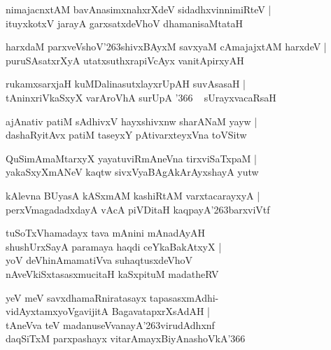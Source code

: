 \documentclass[twoside,12pt,openright]{book}
\def\S{\char'263}
\newcounter{shloka}[chapter]
\begin{document}
\begin{shloka}%
nimajacnxtAM bavAnasimxnahxrXdeV sidadhxvinnimiRteV |\\
ituyxkotxV jarayA garxsatxdeVhoV dhamanisaMtataH 
\end{shloka}

\begin{shloka}%
harxdaM parxveVshoV\S shivxBAyxM savxyaM cAmajajxtAM harxdeV |\\
puruSAsatxrXyA utatxsuthxrapiVcAyx vanitApirxyAH
\end{shloka}

\begin{shloka}%
rukamxsarxjaH kuMDalinasutxlayxrUpAH suvAsasaH |\\
tAninxriVkaSxyX varAroVhA surUpA \char'366 ~ sUrayxvacaRsaH
\end{shloka}

\begin{shloka}%
ajAnativ patiM sAdhivxV hayxshivxnw sharANaM yayw |\\
dashaRyitAvx patiM taseyxY pAtivarxteyxVna toVSitw
\end{shloka}

\begin{shloka}%
QuSimAmaMtarxyX yayatuviRmAneVna tirxviSaTxpaM |\\
yakaSxyXmANeV kaqtw sivxVyaBAgAkArAyxshayA yutw
\end{shloka}

\begin{shloka}%
kAlevna BUyasA kASxmAM kashiRtAM varxtacarayxyA |\\
perxVmagadadxdayA vAcA piVDitaH kaqpayA\S barxviVtf 
\end{shloka}

\begin{shloka}%
tuSoTxVhamadayx tava mAnini mAnadAyAH \\
shushUrxSayA paramaya haqdi ceYkaBakAtxyX |\\
yoV deVhinAmamatiVva suhaqtusxdeVhoV\\
nAveVkiSxtasasxmucitaH kaSxpituM madatheRV
\end{shloka}

\begin{shloka}%
yeV meV savxdhamaRniratasayx tapasasxmAdhi-\\
vidAyxtamxyoVgavijitA BagavatapxrXsAdAH |\\
tAneVva teV madanuseVvanayA\S virudAdhxnf \\
daqSiTxM parxpashayx vitarAmayxBiyAnashoVkA\char'366
\end{shloka}
\end{document}

